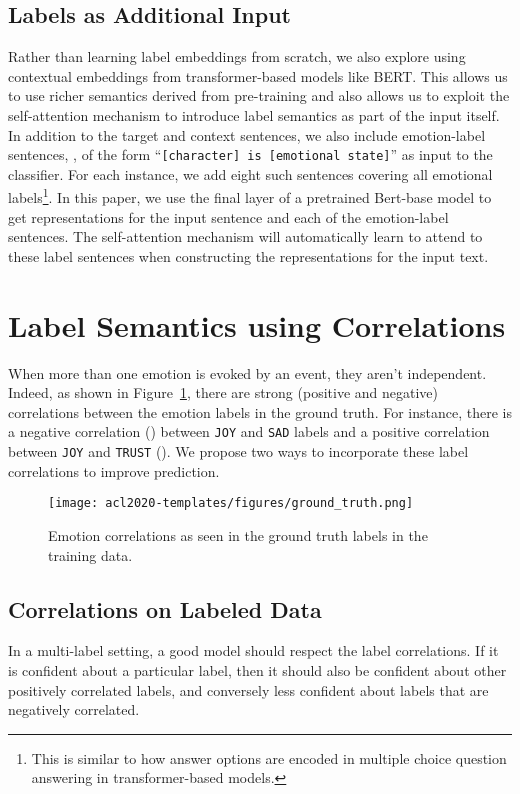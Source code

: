 \documentclass[11pt,a4paper]{article}
\begin{document}
\subsection{Labels as Additional Input}
Rather than learning label embeddings from scratch, we also explore using contextual embeddings from transformer-based models like BERT. This allows us to use richer semantics derived from pre-training and also allows us to exploit the self-attention mechanism to introduce label semantics as part of the input itself. In addition to the target and context sentences, we also include emotion-label sentences, , of the form ``\texttt{[character] is [emotional state]}'' as input to the classifier. For each instance, we add eight such sentences covering all emotional labels\footnote{This is similar to how answer options are encoded in multiple choice question answering in transformer-based models.}. In this paper, we use the final layer of a pretrained Bert-base model to get representations for the input sentence and each of the emotion-label sentences. The self-attention mechanism will automatically learn to attend to these label sentences when constructing the representations for the input text. 

\section{Label Semantics using Correlations}
\label{sec:labelcorrelations}
When more than one emotion is evoked by an event, they aren't independent. Indeed, as shown in Figure~\ref{fig:label_corrrelations}, there are strong (positive and negative) correlations between the emotion labels in the ground truth. For instance, there is a negative correlation () between \texttt{JOY} and \texttt{SAD} labels and a positive correlation between \texttt{JOY} and \texttt{TRUST} (). We propose two ways to incorporate these label correlations to improve prediction.
  \begin{figure}[t]
    
    \texttt{[image: acl2020-templates/figures/ground\_truth.png]}
    \caption{Emotion correlations as seen in the ground truth labels in the training data.
    }\label{fig:label_corrrelations}
  \end{figure}

\subsection{Correlations on Labeled Data}
\label{sec:softtraining}
In a multi-label setting, a good model should respect the label correlations. If it is confident about a particular label, then it should also be confident about other positively correlated labels, and conversely less confident about labels that are negatively correlated. 
\end{document}
